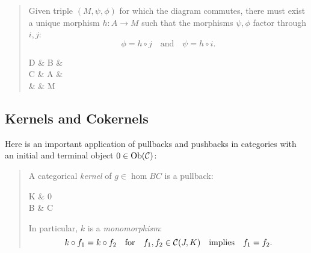 \documentclass[11pt]{article}
\theoremstyle{definition}
\begin{document}
\begin{multicols}{2}
  \begin{quotation}
    Given triple $(M, \psi, \phi)$ for which the diagram commutes, there must exist a unique morphism $h: A\to M$ such that the morphisms $\psi,\phi$ factor through $i,j$:
    \vspace*{-0.1cm}
    \[ \phi=h\circ j \quad\text{and}\quad \psi=h\circ i. \]
    \columnbreak
    \vspace*{-0.5in}
    \begin{cd}
      D \ar[r, "f"] \ar[d, "g"]                     \& B \ar[d, "i"] \ar[rdd, bend left=15, "\psi"] \& \\ 
      C \ar[r, "j"] \ar[rrd, bend right=15, "\phi"] \& A   \& \\
      \& \& M
    \end{cd}
  \end{quotation}
\end{multicols}

\break
\subsection{Kernels and Cokernels}

Here is an important application of pullbacks and pushbacks in categories with an initial and terminal object $0\in\mathrm{Ob}(\mathcal{C})$:

\begin{quotation}
  A categorical \textit{kernel} of $g\in\hom{B}{C}$ is a pullback:
  \vspace{-0.1in}
  \begin{cd}
    K \ar[r] \ar[d, "k"]  \& 0 \ar[d] \\ 
    B \ar[r, "g"]            \& C
  \end{cd}
  In particular, $k$ is a \textit{monomorphism}:
  \[ k\circ f_1=k\circ f_2 \quad \text{for} \quad f_1,f_2\in\mathcal{C}(J,K) \quad \text{implies} \quad f_1=f_2. \]

  \iffalse
  Consider the diagram:
  \vspace{-0.3in}
  \begin{cd}
    J \ar[rrd, bend left=15, "i"] \ar[rd, dotted, "\exists !h" description] \ar[rdd, bend right=15, "j"'] \& \& \& \\
    \& K' \ar[r, "k'"] \ar[d] \& K \ar[r] \ar[d, "k"]  \& 0 \ar[d, "\iota"] \\ 
    \& 0  \ar[r, "\iota"]     \& B \ar[r, "g"]         \& C
  \end{cd}
  Where $\iota$ is inclusion and $K'$ is the kernel of $k:K\to B$; i.e., left square is a pullback. In particular, by 
  Lemma 1 above, the outer triangle is a pullback. That is to say, $K'$ is the kernel of $\iota:0\to C$, which is 
  tautologically a monomorphism, therefore $K'=0$. Now, let $i=f_1-f_2$ and $j=k\circ f_1-k\circ f_2=0$, then since 
  $k\circ i=\iota\circ j$, we get a unique morphism $h:J\to K'$ s.t. $i=k'\circ h$, which means $i$ factors through 
  $K'=0$, hence $i=f_1-f_2=0$.\qed
  \fi
\end{quotation}
\end{document}
